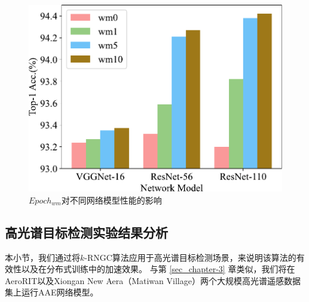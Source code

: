 \documentclass{xdupgthesis}
\begin{document}
\begin{figure}[ht]
    \centering
    \includegraphics[width=0.65\linewidth]{epoch_wm_chap-4-2.pdf}
    \caption{$Epoch_{wm}$对不同网络模型性能的影响}
    \label{fig_Result-Epoch-wm}
\end{figure}


\subsection{高光谱目标检测实验结果分析}
本小节，我们通过将$k$-RNGC算法应用于高光谱目标检测场景，来说明该算法的有效性以及在分布式训练中的加速效果。
与第 \ref*{sec_chapter-3} 章类似，我们将在AeroRIT以及Xiongan New Aera（Matiwan Village）两个大规模高光谱遥感数据集上运行AAE网络模型。
\end{document}
